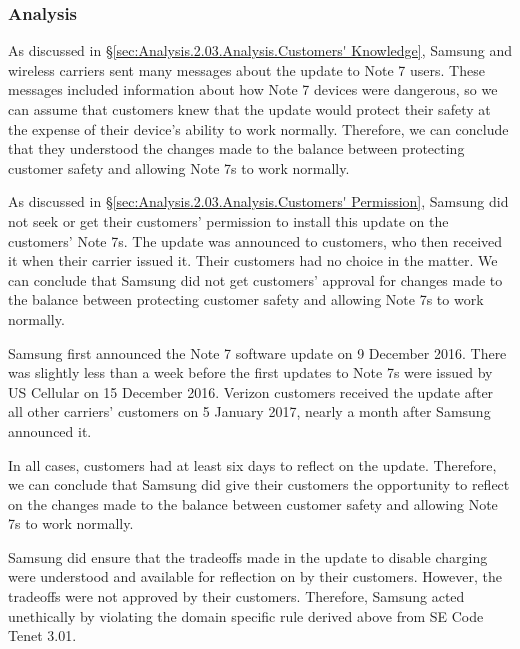 \documentclass[12pt]{article}
\newcounter{subsubsubsection}[subsubsection]
\begin{document}
   \subsubsection{Analysis}
   
	As discussed in \S\ref{sec:Analysis.2.03.Analysis.Customers' Knowledge}, Samsung and wireless carriers sent many messages about the update to Note 7 users\cite{samsungFullRecallAnnounce}\cite{CPSC}\cite{bgrCarriersRecallMessages}\cite{pocketnowNoLongerWorkMessageUSCellular}\cite{youtubeKillUpdateScreenshots}. These messages included information about how Note 7 devices were dangerous, so we can assume that customers knew that the update would protect their safety at the expense of their device's ability to work normally\cite{bgrCarriersRecallMessages}. Therefore, we can conclude that they understood the changes made to the balance between protecting customer safety and allowing Note 7s to work normally.
      
      As discussed in \S\ref{sec:Analysis.2.03.Analysis.Customers' Permission}, Samsung did not seek or get their customers' permission to install this update on the customers' Note 7s\cite{samsungFullRecallAnnounce}. The update was announced to customers, who then received it when their carrier issued it. Their customers had no choice in the matter. We can conclude that Samsung did not get customers' approval for changes made to the balance between protecting customer safety and allowing Note 7s to work normally.
      
      Samsung first announced the Note 7 software update on 9 December 2016\cite{samsungNewsroomUpdateAnnoucement}. There was slightly less than a week before the first updates to Note 7s were issued by US Cellular on 15 December 2016\cite{vergeFirstDisabledPhones}. Verizon customers received the update after all other carriers' customers on 5 January 2017, nearly a month after Samsung announced it\cite{verizonPressRelease}.
      
      In all cases, customers had at least six days to reflect on the update. Therefore, we can conclude that Samsung did give their customers the opportunity to reflect on the changes made to the balance between customer safety and allowing Note 7s to work normally.
      
      Samsung did ensure that the tradeoffs made in the update to disable charging were understood and available for reflection on by their customers\cite{samsungFullRecallAnnounce}\cite{samsungNewsroomUpdateAnnoucement}\cite{verizonPressRelease}. However, the tradeoffs were not approved by their customers\cite{samsungFullRecallAnnounce}. Therefore, Samsung acted unethically by violating the domain specific rule derived above from SE Code Tenet 3.01.
      
\end{document}
